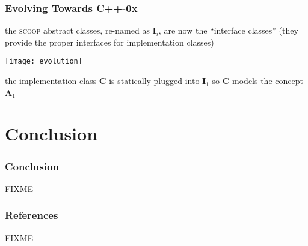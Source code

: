 \documentclass{beamer}
\newcommand{\scoop}{\textsc{scoop}\xspace}
\begin{document}
\begin{frame}
  \frametitle{Evolving Towards C++-0x}

  {\scriptsize{ the \scoop abstract classes, re-named as
      \textbf{I$_i$}, are now the ``interface classes'' (they provide
      the proper interfaces for implementation classes) }}

\vspace*{-2mm}
  \begin{center}
    \texttt{[image: evolution]}
  \end{center}

\vspace*{-3mm}
{\scriptsize{
    the implementation class \textbf{C} is statically plugged into \textbf{I$_1$} so \textbf{C} models the concept \textbf{A$_1$}
}}

\end{frame}


\section*{Conclusion}

\begin{frame}
  \frametitle{Conclusion}

FIXME

\end{frame}


\begin{frame}
  \frametitle{References}

FIXME

\end{frame}





\end{document}
